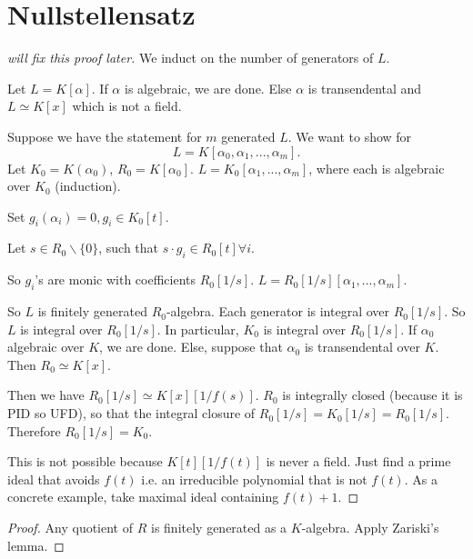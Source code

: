 \section{Nullstellensatz}

\begin{proof}[will fix this proof later]
    We induct on the number of generators of $L$. 

    Let $L=K[\alpha]$. If $\alpha$ is algebraic, we are done. Else $\alpha$ is transendental and $L \simeq K[x]$ which is not a field.

    Suppose we have the statement for $m$ generated $L$. We want to show for \[
    L=K[\alpha_0,\alpha_1,...,\alpha_m].
    \]
    Let $K_0=K(\alpha_0)$, $R_0=K[\alpha_0]$. 
    $L=K_0[\alpha_1,...,\alpha_m]$, where each is algebraic over $K_0$ (induction).

    Set $g_i(\alpha_i)=0,g_i\in K_0[t]$.

    Let $s\in R_0\backslash \{0\}$, such that $s\cdot g_i\in R_0[t]\forall i$.

    So $g_i$'s are monic with coefficients $R_0[1/s]$. $L=R_0[1/s][\alpha_1,...,\alpha_m]$.

    So $L$ is finitely generated $R_0$-algebra. Each generator is integral over $R_0[1/s]$. So $L$ is integral over $R_0[1/s]$. In particular, $K_0$ is integral over $R_0[1/s]$. If $\alpha_0$ algebraic over $K$, we are done. Else, suppose that $\alpha_0$ is transendental over $K$. Then $R_0\simeq K[x]$.

    Then we have $R_0[1/s]\simeq K[x][1/f(s)]$. $R_0$ is integrally closed (because it is PID so UFD), so that the integral closure of $R_0[1/s]=K_0[1/s]=R_0[1/s].$ Therefore $R_0[1/s]=K_0$.

    This is not possible because $K[t][1/f(t)]$ is never a field. Just find a prime ideal that avoids $f(t)$ i.e. an irreducible polynomial that is not $f(t)$. As a concrete example, take maximal ideal containing $f(t)+1$. 
\end{proof}


\begin{proof}
    Any quotient of $R$ is finitely generated as a $K$-algebra. Apply Zariski's lemma.
\end{proof}

